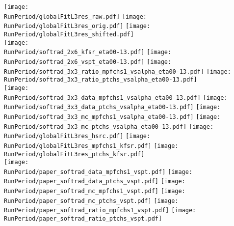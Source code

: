 \documentclass[landscape,10pt]{beamer} %
\def\RunPeriod{BCDEF}%
\begin{document}
\newpage
\texttt{[image: \\RunPeriod/globalFitL3res\_raw.pdf]}
\texttt{[image: \\RunPeriod/globalFitL3res\_orig.pdf]}
\texttt{[image: \\RunPeriod/globalFitL3res\_shifted.pdf]}\\
\texttt{[image: \\RunPeriod/softrad\_2x6\_kfsr\_eta00-13.pdf]}
\texttt{[image: \\RunPeriod/softrad\_2x6\_vspt\_eta00-13.pdf]}
\texttt{[image: \\RunPeriod/softrad\_3x3\_ratio\_mpfchs1\_vsalpha\_eta00-13.pdf]}
\texttt{[image: \\RunPeriod/softrad\_3x3\_ratio\_ptchs\_vsalpha\_eta00-13.pdf]}\\

\texttt{[image: \\RunPeriod/softrad\_3x3\_data\_mpfchs1\_vsalpha\_eta00-13.pdf]}
\texttt{[image: \\RunPeriod/softrad\_3x3\_data\_ptchs\_vsalpha\_eta00-13.pdf]}
\texttt{[image: \\RunPeriod/softrad\_3x3\_mc\_mpfchs1\_vsalpha\_eta00-13.pdf]} 
\texttt{[image: \\RunPeriod/softrad\_3x3\_mc\_ptchs\_vsalpha\_eta00-13.pdf]}  
\texttt{[image: \\RunPeriod/globalFitL3res\_hsrc.pdf]}
\texttt{[image: \\RunPeriod/globalFitL3res\_mpfchs1\_kfsr.pdf]}
\texttt{[image: \\RunPeriod/globalFitL3res\_ptchs\_kfsr.pdf]}\\

\texttt{[image: \\RunPeriod/paper\_softrad\_data\_mpfchs1\_vspt.pdf]}
\texttt{[image: \\RunPeriod/paper\_softrad\_data\_ptchs\_vspt.pdf]}
\texttt{[image: \\RunPeriod/paper\_softrad\_mc\_mpfchs1\_vspt.pdf]}
\texttt{[image: \\RunPeriod/paper\_softrad\_mc\_ptchs\_vspt.pdf]}
\texttt{[image: \\RunPeriod/paper\_softrad\_ratio\_mpfchs1\_vspt.pdf]}
\texttt{[image: \\RunPeriod/paper\_softrad\_ratio\_ptchs\_vspt.pdf]}
\end{document}
